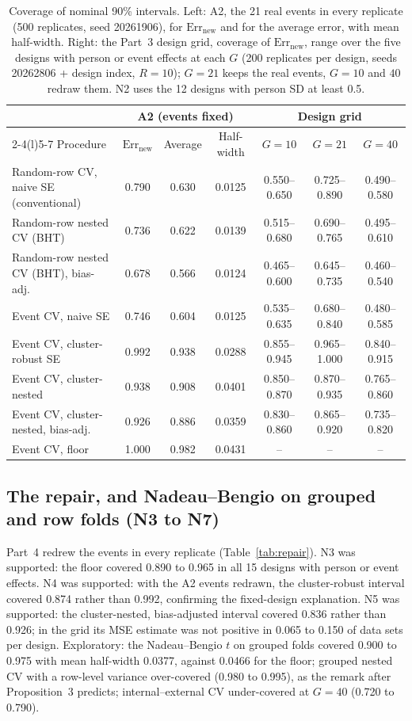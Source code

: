 \documentclass[11pt]{amsart}
\theoremstyle{plain}
\theoremstyle{definition}
\theoremstyle{remark}
\newcommand{\Errnew}{\mathrm{Err}_{\mathrm{new}}}
\begin{document}
\begin{table}[tbp]
\centering\footnotesize
\caption{Coverage of nominal 90\% intervals. Left: A2, the 21 real events in every replicate (500 replicates, seed 20261906), for $\Errnew$ and for the average error, with mean half-width. Right: the Part~3 design grid, coverage of $\Errnew$, range over the five designs with person or event effects at each $G$ (200 replicates per design, seeds 20262806 + design index, $R=10$); $G=21$ keeps the real events, $G=10$ and $40$ redraw them. N2 uses the 12 designs with person SD at least 0.5.}\label{tab:a2}
\begin{tabular}{@{}l c c c c c c@{}}
\toprule
 & \multicolumn{3}{c}{A2 (events fixed)} & \multicolumn{3}{c}{Design grid}\\
\cmidrule(lr){2-4}\cmidrule(l){5-7}
Procedure & $\Errnew$ & Average & Half-width & $G=10$ & $G=21$ & $G=40$\\
\midrule
Random-row CV, naive SE (conventional) & 0.790 & 0.630 & 0.0125 & 0.550--0.650 & 0.725--0.890 & 0.490--0.580 \\
Random-row nested CV (BHT) & 0.736 & 0.622 & 0.0139 & 0.515--0.680 & 0.690--0.765 & 0.495--0.610 \\
Random-row nested CV (BHT), bias-adj. & 0.678 & 0.566 & 0.0124 & 0.465--0.600 & 0.645--0.735 & 0.460--0.540 \\
Event CV, naive SE & 0.746 & 0.604 & 0.0125 & 0.535--0.635 & 0.680--0.840 & 0.480--0.585 \\
Event CV, cluster-robust SE & 0.992 & 0.938 & 0.0288 & 0.855--0.945 & 0.965--1.000 & 0.840--0.915 \\
Event CV, cluster-nested & 0.938 & 0.908 & 0.0401 & 0.850--0.870 & 0.870--0.935 & 0.765--0.860 \\
Event CV, cluster-nested, bias-adj. & 0.926 & 0.886 & 0.0359 & 0.830--0.860 & 0.865--0.920 & 0.735--0.820 \\
Event CV, floor & 1.000 & 0.982 & 0.0431 & -- & -- & -- \\
\bottomrule
\end{tabular}
\end{table}

\subsection{The repair, and Nadeau--Bengio on grouped and row folds (N3 to N7)}\label{sec:repair}

Part~4 redrew the events in every replicate (Table~\ref{tab:repair}). N3 was supported: the floor covered 0.890 to 0.965 in all 15 designs with person or event effects. N4 was supported: with the A2 events redrawn, the cluster-robust interval covered 0.874 rather than 0.992, confirming the fixed-design explanation. N5 was supported: the cluster-nested, bias-adjusted interval covered 0.836 rather than 0.926; in the grid its MSE estimate was not positive in 0.065 to 0.150 of data sets per design. Exploratory: the Nadeau--Bengio $t$ on grouped folds covered 0.900 to 0.975 with mean half-width 0.0377, against 0.0466 for the floor; grouped nested CV with a row-level variance over-covered (0.980 to 0.995), as the remark after Proposition~3 predicts; internal--external CV under-covered at $G=40$ (0.720 to 0.790).
\end{document}
